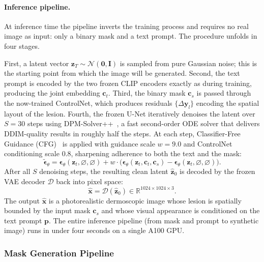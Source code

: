 \paragraph{Inference pipeline.}
At inference time the pipeline inverts the training process and requires no real image as input: only a binary mask and a text prompt. The procedure unfolds in four stages.

First, a latent vector $\mathbf{z}_T \sim \mathcal{N}(\mathbf{0}, \mathbf{I})$ is sampled from pure Gaussian noise; this is the starting point from which the image will be generated. Second, the text prompt is encoded by the two frozen CLIP encoders exactly as during training, producing the joint embedding $\mathbf{c}_t$. Third, the binary mask $\mathbf{c}_s$ is passed through the now-trained ControlNet, which produces residuals $\{\Delta\mathbf{y}_l\}$ encoding the spatial layout of the lesion. Fourth, the frozen U-Net iteratively denoises the latent over $S=30$ steps using DPM-Solver++~\cite{lu2022dpmsolverpp}, a fast second-order ODE solver that delivers DDIM-quality results in roughly half the steps. At each step, Classifier-Free Guidance (CFG)~\cite{ho2022classifierfree} is applied with guidance scale $w=9.0$ and ControlNet conditioning scale $0.8$, sharpening adherence to both the text and the mask:
\begin{equation}
    \tilde{\boldsymbol{\epsilon}}_\theta = \boldsymbol{\epsilon}_\theta(\mathbf{z}_t,\varnothing,\varnothing) + w\cdot\bigl(\boldsymbol{\epsilon}_\theta(\mathbf{z}_t,\mathbf{c}_t,\mathbf{c}_s) - \boldsymbol{\epsilon}_\theta(\mathbf{z}_t,\varnothing,\varnothing)\bigr).
\end{equation}
After all $S$ denoising steps, the resulting clean latent $\hat{\mathbf{z}}_0$ is decoded by the frozen VAE decoder $\mathcal{D}$ back into pixel space:
\begin{equation}
    \hat{\mathbf{x}} = \mathcal{D}(\hat{\mathbf{z}}_0) \in \mathbb{R}^{1024\times1024\times3}.
\end{equation}
The output $\hat{\mathbf{x}}$ is a photorealistic dermoscopic image whose lesion is spatially bounded by the input mask $\mathbf{c}_s$ and whose visual appearance is conditioned on the text prompt $\mathbf{p}$. The entire inference pipeline (from mask and prompt to synthetic image) runs in under four seconds on a single A100 GPU.


\subsubsection{Mask Generation Pipeline}\label{sec:maskgen}

